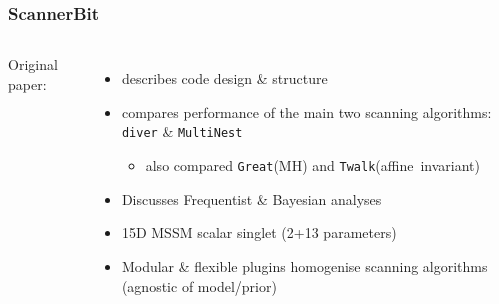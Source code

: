 \documentclass[aspectratio=169]{beamer}
\begin{document}
\begin{frame}[fragile]
    \frametitle{ScannerBit~}
    \begin{columns}
        Original paper:
        \begin{itemize}
            \item describes code design \& structure
            \item compares performance of the main two scanning algorithms: \texttt{diver} \& \texttt{MultiNest}
                \begin{itemize}
                    \item also compared \texttt{Great}(MH) and \texttt{Twalk}(affine~invariant) 
                \end{itemize}
            \item Discusses Frequentist \& Bayesian analyses
            \item 15D MSSM scalar singlet (2+13 parameters)
            \item Modular \& flexible plugins homogenise scanning algorithms (agnostic of model/prior)
        \end{itemize}
        

\end{columns}
\end{frame}
\end{document}
